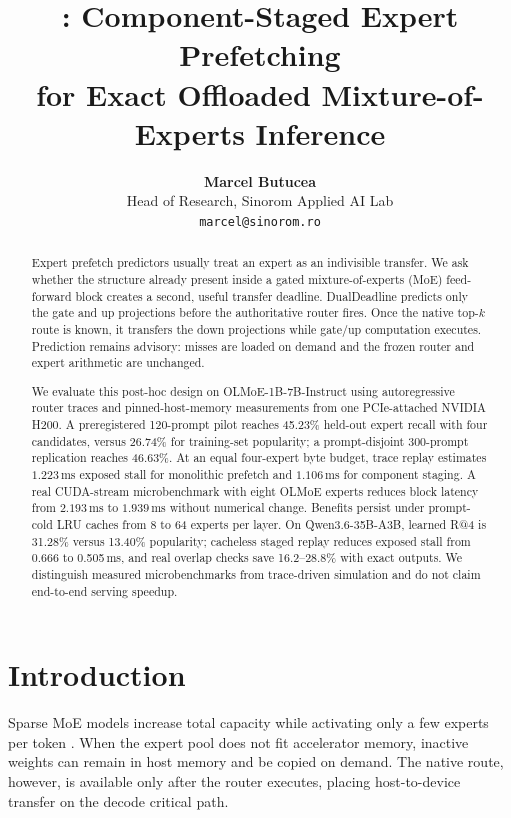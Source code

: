 \documentclass[10pt,twocolumn]{article}
\title{\vspace{-1.5em}\method: Component-Staged Expert Prefetching\\
for Exact Offloaded Mixture-of-Experts Inference}
\author{\textbf{Marcel Butucea}\\[-0.15em]
\small Head of Research, Sinorom Applied AI Lab\\[-0.15em]
\small\texttt{marcel@sinorom.ro}}
\date{}
\newcommand{\method}{DualDeadline}
\newcommand{\ms}{\,\mathrm{ms}}
\begin{document}
\maketitle
\vspace{-1.4em}

\begin{abstract}
Expert prefetch predictors usually treat an expert as an indivisible transfer.
We ask whether the structure already present inside a gated mixture-of-experts
(MoE) feed-forward block creates a second, useful transfer deadline.
\method{} predicts only the gate and up projections before the authoritative
router fires.  Once the native top-$k$ route is known, it transfers the down
projections while gate/up computation executes.  Prediction remains advisory:
misses are loaded on demand and the frozen router and expert arithmetic are
unchanged.

We evaluate this post-hoc design on OLMoE-1B-7B-Instruct using autoregressive
router traces and pinned-host-memory measurements from one PCIe-attached
NVIDIA H200.  A preregistered 120-prompt pilot reaches 45.23\% held-out
expert recall with four candidates, versus 26.74\% for training-set
popularity; a prompt-disjoint 300-prompt replication reaches 46.63\%.
At an equal four-expert byte budget, trace replay estimates
$1.223\ms$ exposed stall for monolithic prefetch and $1.106\ms$ for
component staging.  A real CUDA-stream microbenchmark with eight OLMoE
experts reduces block latency from $2.193\ms$ to $1.939\ms$ without numerical
change.  Benefits persist under prompt-cold LRU caches from 8 to 64 experts
per layer.  On Qwen3.6-35B-A3B, learned R@4 is 31.28\% versus 13.40\%
popularity; cacheless staged replay reduces exposed stall from 0.666 to
0.505\,ms, and real overlap checks save 16.2--28.8\% with exact outputs.
We distinguish measured microbenchmarks from trace-driven simulation and do
not claim end-to-end serving speedup.
\end{abstract}

\section{Introduction}
Sparse MoE models increase total capacity while activating only a few experts
per token \cite{shazeer2017moe,fedus2022switch}.  When the expert pool does
not fit accelerator memory, inactive weights can remain in host memory and be
copied on demand.  The native route, however, is available only after the
router executes, placing host-to-device transfer on the decode critical path.
\end{document}
